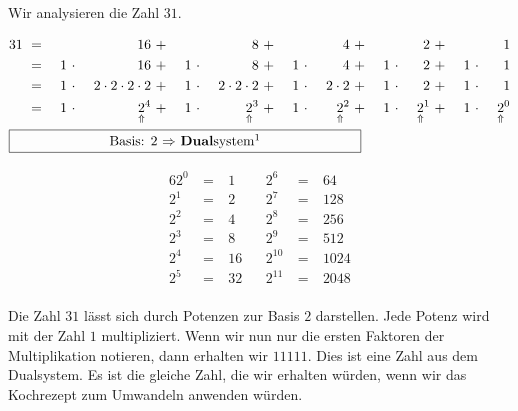 \begin{example}
\label{ex:analyse-31}
Wir analysieren die Zahl $31$.

\begin{minipage}{0.6\textwidth}
\begin{alignat*}{16}
31 & ~ = ~ & & & 16 & ~ + ~ & & & 8 & ~ + ~ & & & 4 & ~ + ~ & & & 2 & ~ + ~ & & & 1 \\
& ~ = ~ & 1 & ~\cdot~ & 16 & ~ + ~ & 1 & ~\cdot~ & 8 & ~ + ~ & 1 & ~\cdot~ & 4 & ~ + ~ & 1 & ~\cdot~ & 2 & ~ + ~ & 1 & ~\cdot~ & 1 \\
& ~ = ~ & 1 & ~\cdot~ & 2 \cdot 2 \cdot 2 \cdot 2  & ~ + ~ & 1 & ~\cdot~ & 2 \cdot 2 \cdot 2  & ~ + ~ & 1 & ~\cdot~ & 2 \cdot 2 & ~ + ~ & 1 & ~\cdot~ & 2 & ~ + ~ & 1 & ~\cdot~ & 1 \\
& ~ = ~ & 1 & ~\cdot~ & \underset{\Uparrow}{2}^4  & ~ + ~ & 1 & ~\cdot~ & \underset{\Uparrow}{2}^3  & ~ + ~ & 1 & ~\cdot~ & \underset{\Uparrow}{2}^2 & ~ + ~ & 1 & ~\cdot~ & \underset{\Uparrow}{2}^1 & ~ + ~ & 1 & ~\cdot~ & \underset{\Uparrow}{2}^0 \\
\omit\rlap{\framebox[9cm]{Basis: $2$ $\Rightarrow$ \textbf{Dual}system\footnotemark}}
\end{alignat*}
\end{minipage}
\hfill
\begin{minipage}{0.35\textwidth}
\begin{alignat*}{6}
2^0 & ~ = ~ & 1 & ~~~~ 	2^6 & ~ = ~ & 64  \\
2^1 & ~ = ~ & 2	 & ~~~~	2^7 & ~ = ~ & 128  \\
2^2 & ~ = ~ & 4	 & ~~~~	2^8 & ~ = ~ & 256  \\
2^3 & ~ = ~ & 8	 & ~~~~	2^9 & ~ = ~ & 512  \\
2^4 & ~ = ~ & 16 &~~~~ 	2^{10} & ~ = ~ & 1024  \\
2^5 & ~ = ~ & 32 &~~~~ 	2^{11} & ~ = ~ & 2048  \\
\end{alignat*}
\end{minipage}
Die Zahl $31$ lässt sich durch Potenzen zur Basis $2$ darstellen. Jede Potenz wird mit der Zahl $1$ multipliziert.  Wenn wir nun nur die ersten Faktoren der Multiplikation notieren, dann erhalten wir $11111$. Dies ist eine Zahl aus dem Dualsystem. Es ist die gleiche Zahl, die wir erhalten würden, wenn wir das Kochrezept zum Umwandeln anwenden würden.

\end{example}


